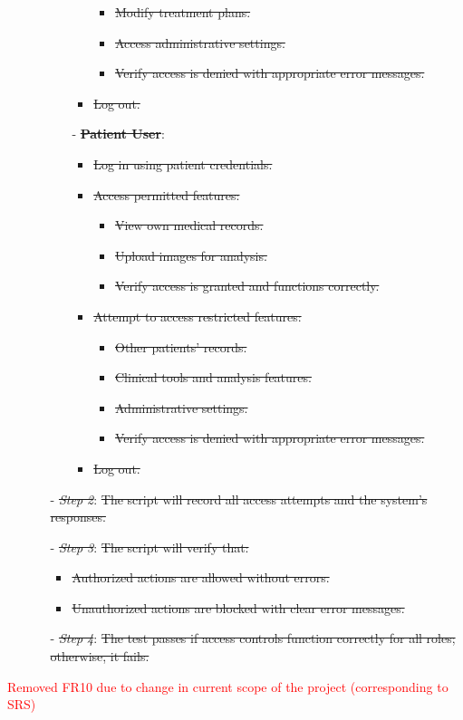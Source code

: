 \documentclass[12pt, titlepage]{article}
\begin{document}
\begin{enumerate}
\begin{itemize}
\begin{itemize}
\begin{itemize}
            \begin{itemize}
              \item \sout{Modify treatment plans.}
              \item \sout{Access administrative settings.}
              \item \sout{Verify access is denied with appropriate error messages.}
            \end{itemize}
          \item \sout{Log out.}
        \end{itemize}
      \item[-] \textbf{\sout{Patient User}}:
        \begin{itemize}
          \item \sout{Log in using patient credentials.}
          \item \sout{Access permitted features:}
            \begin{itemize}
              \item \sout{View own medical records.}
              \item \sout{Upload images for analysis.}
              \item \sout{Verify access is granted and functions correctly.}
            \end{itemize}
          \item \sout{Attempt to access restricted features:}
            \begin{itemize}
              \item \sout{Other patients' records.}
              \item \sout{Clinical tools and analysis features.}
              \item \sout{Administrative settings.}
              \item \sout{Verify access is denied with appropriate error messages.}
            \end{itemize}
          \item \sout{Log out.}
        \end{itemize}
    \end{itemize}
  \item[-] \textit{\sout{Step 2}}: \sout{The script will record all access attempts and the system's responses.}
  \item[-] \textit{\sout{Step 3}}: \sout{The script will verify that:}
    \begin{itemize}
      \item \sout{Authorized actions are allowed without errors.}
      \item \sout{Unauthorized actions are blocked with clear error messages.}
    \end{itemize}
  \item[-] \textit{\sout{Step 4}}: \sout{The test passes if access controls function correctly for all roles; otherwise, it fails.}
\end{itemize}
\end{enumerate}
\textcolor{red}{Removed FR10 due to change in current scope of the project (corresponding to SRS)}
\end{document}
